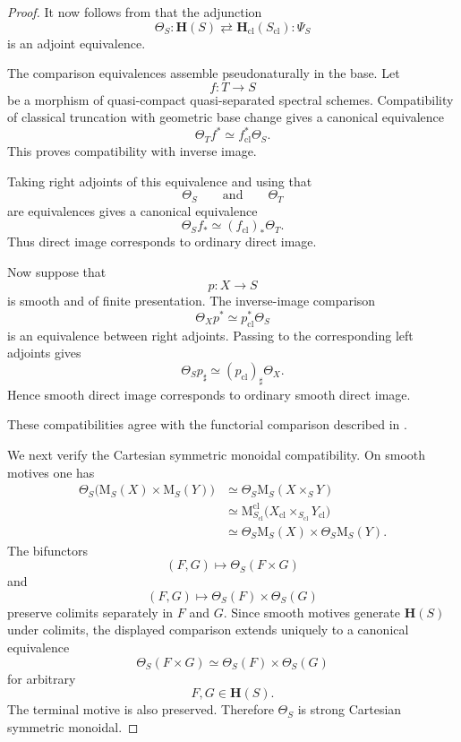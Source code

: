 \begin{proof}
It now follows from
\cite[Corollary~2.7.5]{CisinskiKhanA1Invariance}
that the adjunction
\[
    \Theta_S
    \colon
    \mathbf H(S)
    \rightleftarrows
    \mathbf H_{\mathrm{cl}}(S_{\mathrm{cl}})
    :
    \Psi_S
\]
is an adjoint equivalence.

The comparison equivalences assemble pseudonaturally in the base.  Let
\[
    f
    \colon
    T
    \longrightarrow
    S
\]
be a morphism of quasi-compact quasi-separated spectral schemes.
Compatibility of classical truncation with geometric base change
gives a canonical equivalence
\[
    \Theta_Tf^*
    \simeq
    f_{\mathrm{cl}}^*\Theta_S.
\]
This proves compatibility with inverse image.

Taking right adjoints of this equivalence and using that
\[
    \Theta_S
    \qquad\text{and}\qquad
    \Theta_T
\]
are equivalences gives a canonical equivalence
\[
    \Theta_Sf_*
    \simeq
    (f_{\mathrm{cl}})_*\Theta_T.
\]
Thus direct image corresponds to ordinary direct image.

Now suppose that
\[
    p
    \colon
    X
    \longrightarrow
    S
\]
is smooth and of finite presentation.  The inverse-image comparison
\[
    \Theta_Xp^*
    \simeq
    p_{\mathrm{cl}}^*\Theta_S
\]
is an equivalence between right adjoints.  Passing to the corresponding
left adjoints gives
\[
    \Theta_Sp_\sharp
    \simeq
    (p_{\mathrm{cl}})_\sharp\Theta_X.
\]
Hence smooth direct image corresponds to ordinary smooth direct image.

These compatibilities agree with the functorial comparison described
in
\cite[Remark~2.7.9]{CisinskiKhanA1Invariance}.

We next verify the Cartesian symmetric monoidal compatibility.  On
smooth motives one has
\[
\begin{aligned}
    \Theta_S
    \bigl(
        \mathrm M_S(X)
        \times
        \mathrm M_S(Y)
    \bigr)
    &\simeq
    \Theta_S
    \mathrm M_S(X\times_SY)
    \\
    &\simeq
    \mathrm M^{\mathrm{cl}}_{S_{\mathrm{cl}}}
    \bigl(
        X_{\mathrm{cl}}
        \times_{S_{\mathrm{cl}}}
        Y_{\mathrm{cl}}
    \bigr)
    \\
    &\simeq
    \Theta_S\mathrm M_S(X)
    \times
    \Theta_S\mathrm M_S(Y).
\end{aligned}
\]
The bifunctors
\[
    (F,G)
    \longmapsto
    \Theta_S(F\times G)
\]
and
\[
    (F,G)
    \longmapsto
    \Theta_S(F)\times\Theta_S(G)
\]
preserve colimits separately in \(F\) and \(G\).  Since smooth motives
generate \(\mathbf H(S)\) under colimits, the displayed comparison
extends uniquely to a canonical equivalence
\[
    \Theta_S(F\times G)
    \simeq
    \Theta_S(F)\times\Theta_S(G)
\]
for arbitrary
\[
    F,G
    \in
    \mathbf H(S).
\]
The terminal motive is also preserved.  Therefore \(\Theta_S\) is
strong Cartesian symmetric monoidal.


\end{proof}
